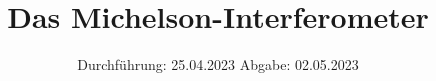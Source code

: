 

%

\subject{V401}
\title{Das Michelson-Interferometer}
\date{%
  Durchführung: 25.04.2023
  \hspace{3em}
  Abgabe: 02.05.2023
}


\setlength{\parindent}{0pt} %

\maketitle
\thispagestyle{empty}
\tableofcontents
\newpage



%



\printbibliography{}





